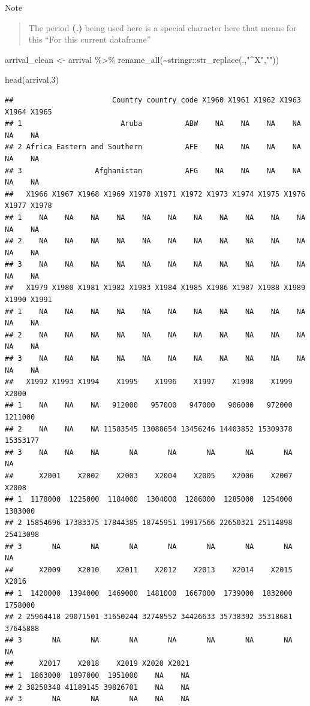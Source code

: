 \documentclass[
]{book}
\newenvironment{Shaded}{\begin{snugshade}}{\end{snugshade}}
\newcommand{\DecValTok}[1]{\textcolor[rgb]{0.00,0.00,0.81}{#1}}
\newcommand{\FunctionTok}[1]{\textcolor[rgb]{0.00,0.00,0.00}{#1}}
\newcommand{\NormalTok}[1]{#1}
\newcommand{\OtherTok}[1]{\textcolor[rgb]{0.56,0.35,0.01}{#1}}
\newcommand{\SpecialCharTok}[1]{\textcolor[rgb]{0.00,0.00,0.00}{#1}}
\newcommand{\StringTok}[1]{\textcolor[rgb]{0.31,0.60,0.02}{#1}}
\begin{document}
Note

\begin{quote}
The period \textbf{(.)} being used here is a special character here that means for this ``For this current dataframe''
\end{quote}

\begin{Shaded}
\begin{Highlighting}[]
\NormalTok{arrival\_clean }\OtherTok{\textless{}{-}}\NormalTok{ arrival }\SpecialCharTok{\%\textgreater{}\%} 
  \FunctionTok{rename\_all}\NormalTok{(}\SpecialCharTok{\textasciitilde{}}\NormalTok{stringr}\SpecialCharTok{::}\FunctionTok{str\_replace}\NormalTok{(.,}\StringTok{"\^{}X"}\NormalTok{,}\StringTok{""}\NormalTok{))}

\FunctionTok{head}\NormalTok{(arrival,}\DecValTok{3}\NormalTok{)}
\end{Highlighting}
\end{Shaded}

\begin{verbatim}
##                       Country country_code X1960 X1961 X1962 X1963 X1964 X1965
## 1                       Aruba          ABW    NA    NA    NA    NA    NA    NA
## 2 Africa Eastern and Southern          AFE    NA    NA    NA    NA    NA    NA
## 3                 Afghanistan          AFG    NA    NA    NA    NA    NA    NA
##   X1966 X1967 X1968 X1969 X1970 X1971 X1972 X1973 X1974 X1975 X1976 X1977 X1978
## 1    NA    NA    NA    NA    NA    NA    NA    NA    NA    NA    NA    NA    NA
## 2    NA    NA    NA    NA    NA    NA    NA    NA    NA    NA    NA    NA    NA
## 3    NA    NA    NA    NA    NA    NA    NA    NA    NA    NA    NA    NA    NA
##   X1979 X1980 X1981 X1982 X1983 X1984 X1985 X1986 X1987 X1988 X1989 X1990 X1991
## 1    NA    NA    NA    NA    NA    NA    NA    NA    NA    NA    NA    NA    NA
## 2    NA    NA    NA    NA    NA    NA    NA    NA    NA    NA    NA    NA    NA
## 3    NA    NA    NA    NA    NA    NA    NA    NA    NA    NA    NA    NA    NA
##   X1992 X1993 X1994    X1995    X1996    X1997    X1998    X1999    X2000
## 1    NA    NA    NA   912000   957000   947000   906000   972000  1211000
## 2    NA    NA    NA 11583545 13088654 13456246 14403852 15309378 15353177
## 3    NA    NA    NA       NA       NA       NA       NA       NA       NA
##      X2001    X2002    X2003    X2004    X2005    X2006    X2007    X2008
## 1  1178000  1225000  1184000  1304000  1286000  1285000  1254000  1383000
## 2 15854696 17383375 17844385 18745951 19917566 22650321 25114898 25413098
## 3       NA       NA       NA       NA       NA       NA       NA       NA
##      X2009    X2010    X2011    X2012    X2013    X2014    X2015    X2016
## 1  1420000  1394000  1469000  1481000  1667000  1739000  1832000  1758000
## 2 25964418 29071501 31650244 32748552 34426633 35738392 35318681 37645888
## 3       NA       NA       NA       NA       NA       NA       NA       NA
##      X2017    X2018    X2019 X2020 X2021
## 1  1863000  1897000  1951000    NA    NA
## 2 38258348 41189145 39826701    NA    NA
## 3       NA       NA       NA    NA    NA
\end{verbatim}
\end{document}
